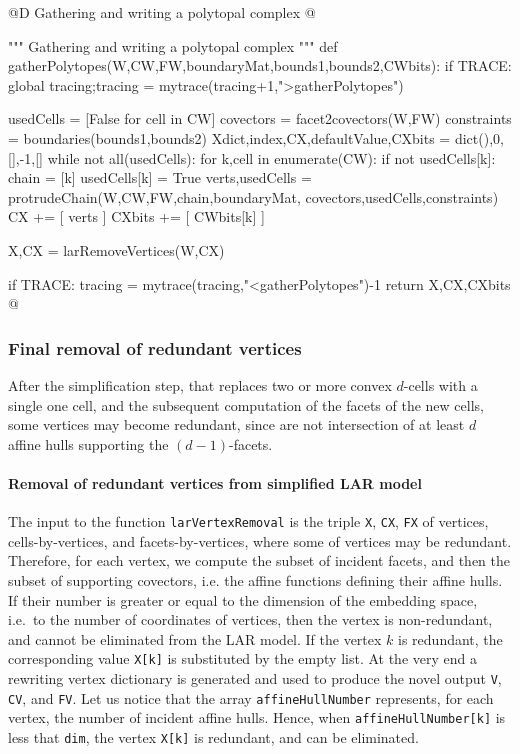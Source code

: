 \documentclass[11pt,oneside]{article}	%
\begin{document}
@D Gathering and writing a polytopal complex
@{""" Gathering and writing a polytopal complex """
def gatherPolytopes(W,CW,FW,boundaryMat,bounds1,bounds2,CWbits):
	if TRACE: global tracing;tracing = mytrace(tracing+1,">gatherPolytopes")

	usedCells = [False for cell in CW]
	covectors = facet2covectors(W,FW)
	constraints = boundaries(bounds1,bounds2)
	Xdict,index,CX,defaultValue,CXbits = dict(),0,[],-1,[]
	while not all(usedCells):
		for k,cell in enumerate(CW):
			if not usedCells[k]:
				chain = [k]
				usedCells[k] = True
				verts,usedCells = protrudeChain(W,CW,FW,chain,boundaryMat,
									covectors,usedCells,constraints)
				CX += [ verts ]
				CXbits += [ CWbits[k] ]
				
	X,CX = larRemoveVertices(W,CX)

	if TRACE: tracing = mytrace(tracing,"<gatherPolytopes")-1
	return X,CX,CXbits
@}

\subsubsection{Final removal of redundant vertices}

After the simplification step, that replaces two or more convex $d$-cells with a single one cell,
and the subsequent computation of the facets of the new cells, some vertices may become redundant,
since are not intersection of at least $d$ affine hulls supporting the $(d-1)$-facets.

\paragraph{Removal of redundant vertices from simplified LAR model}

The input to the function \texttt{larVertexRemoval} is the triple \texttt{X}, \texttt{CX}, \texttt{FX} of vertices, cells-by-vertices, and facets-by-vertices, where some of vertices may be redundant.
Therefore, for each vertex, we compute the subset of incident facets, and then the subset of supporting covectors, i.e. the affine functions defining their affine hulls. If their number is greater or equal to the dimension of the embedding space, i.e.~to the number of coordinates of vertices,  then the vertex is non-redundant, and cannot be eliminated from the LAR model. If the vertex $k$ is redundant, the corresponding value \texttt{X[k]} is substituted by the empty list. At the very end a rewriting vertex dictionary is generated and used to produce the novel output \texttt{V}, \texttt{CV}, and \texttt{FV}.
Let us notice that the array \texttt{affineHullNumber} represents, for each vertex, the number of incident affine hulls. Hence, when \texttt{affineHullNumber[k]} is less that \texttt{dim}, the vertex \texttt{X[k]} is redundant, and can be eliminated.
\end{document}
